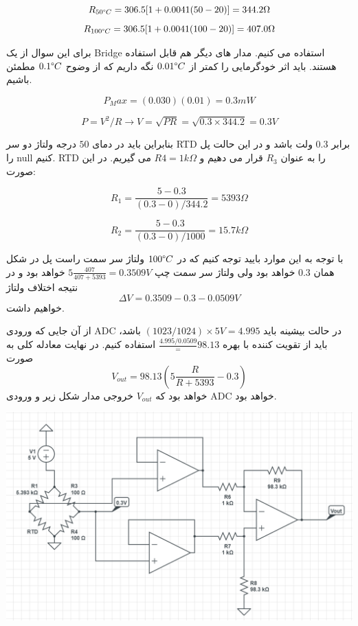 \documentclass[12pt]{article}
\begin{document}
$$R_{50\degree C} = 306.5[1 + 0.0041(50-20)] = 344.2 \Omega$$
$$R_{100 \degree C} = 306.5 [1 + 0.0041 (100 -20)] = 407.0 \Omega$$


برای این سوال از یک Bridge استفاده می کنیم. مدار های دیگر هم قابل استفاده هستند. باید اثر خودگرمایی را کمتر از $0.01 \degree C$ نگه داریم که از وضوح $0.1\degree C$ مطمئن باشیم.

$$P_Max = (0.030)(0.01) = 0.3 mW$$

$$P = V^2 / R \rightarrow V= \sqrt{PR} = \sqrt{0.3 \times 344.2} = 0.3 V$$

بنابراین باید در دمای $50$ درجه ولتاژ دو سر RTD برابر $0.3$ ولت باشد و در این حالت پل را null کنیم. RTD را به عنوان $R_3$ قرار می دهیم و $R4=1k\Omega$ می گیریم. در این صورت:

$$R_1 = \frac{5-0.3}{(0.3-0)/344.2} = 5393 \Omega$$

$$R_2 = \frac{5-0.3}{(0.3-0)/1000} = 15.7 k\Omega$$

با توجه به این موارد بایید توجه کنیم که در $100\degree C$ ولتاژ سر سمت راست پل در شکل همان $0.3$ خواهد بود ولی ولتاژ سر سمت چپ 
$5 \frac{407}{407+5393} = 0.3509 V$
خواهد بود و در نتیجه اختلاف ولتاژ
$$\Delta V = 0.3509 - 0.3 - 0.0509 V$$
خواهیم داشت.

از آن جایی که ورودی ADC در حالت بیشینه باید
$(1023/1024) \times 5V = 4.995$
باشد، باید از تقویت کننده با بهره
$\frac{4.995 / 0.0509} = 98.13$ 
استفاده کنیم. در نهایت معادله کلی به صورت
$$V_{out} = 98.13 (5 \frac{R}{R+5393} - 0.3)$$
خواهد بود که $V_{out}$ خروجی مدار شکل زیر و ورودی ADC خواهد بود.






\begin{center}
	\includegraphics[width = 0.5 \textwidth]{images/8.png}
\end{center}
\end{document}
